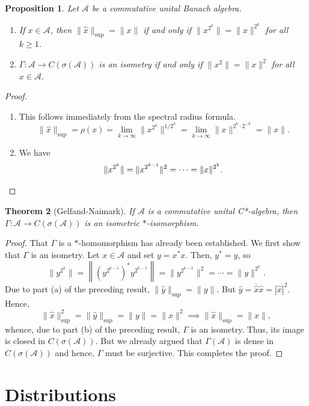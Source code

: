 \documentclass[11pt]{article}
\theoremstyle{thmstyle}
\newtheorem{theorem}{Theorem}[section]
\newtheorem{proposition}[theorem]{Proposition}
\theoremstyle{defstyle}
\newcommand{\calA}{\mathcal{A}} %
\newcommand{\wh}[1]{\widehat{#1}}
\renewcommand{\ge}{\geqslant}
\begin{document}
\begin{proposition}
    Let $\calA$ be a commutative unital Banach algebra. 
    \begin{enumerate}[label=(\alph*)]
    \item If $x\in\calA$, then $\|\wh x\|_{\sup} = \|x\|$ if and only if $\|x^{2^k}\| = \|x\|^{2^k}$ for all $k\ge 1$. 
    \item $\Gamma:\calA\to C(\sigma(\calA))$ is an isometry if and only if $\|x^2\| = \|x\|^2$ for all $x\in\calA$.
    \end{enumerate}
\end{proposition}
\begin{proof}
\begin{enumerate}[label=(\alph*)]
    \item This follows immediately from the spectral radius formula. 
    \begin{equation*}
        \|\wh x\|_{\sup} = \rho(x) = \lim_{k\to\infty}\|x^{2^k}\|^{1/2^k} = \lim_{k\to\infty}\|x\|^{2^k\cdot 2^{-k}} = \|x\|.
    \end{equation*}
    \item We have
    \begin{equation*}
        \|x^{2^k}\| = \|x^{2^{k - 1}}\|^2 = \cdots = \|x\|^{2^k}. \qedhere
    \end{equation*}
\end{enumerate}
\end{proof}

\begin{theorem}[Gelfand-Naimark]
    If $\calA$ is a commutative unital C*-algebra, then $\Gamma:\calA\to C(\sigma(\calA))$ is an isometric $\ast$-isomorphism.
\end{theorem}
\begin{proof}
    That $\Gamma$ is a $\ast$-homomorphism has already been established. We first show that $\Gamma$ is an isometry. Let $x\in\calA$ and set $y = x^\ast x$. Then, $y^\ast = y$, so 
    \begin{equation*}
        \|y^{2^k}\| = \left\|\left(y^{2^{k - 1}}\right)^\ast y^{2^{k - 1}}\right\| = \|y^{2^{k - 1}}\|^2 = \cdots = \|y\|^{2^k}.
    \end{equation*}
    Due to part (a) of the preceding result, $\|\wh y\|_{\sup} = \|y\|$. But $\wh y = \overline{\wh x}\wh x = |\wh x|^2$. Hence,
    \begin{equation*}
        \|\wh x\|_{\sup}^2 = \|\wh y\|_{\sup} = \|y\| = \|x\|^2\implies\|\wh x\|_{\sup} = \|x\|,
    \end{equation*}
    whence, due to part (b) of the preceding result, $\Gamma$ is an isometry. Thus, its image is closed in $C(\sigma(\calA))$. But we already argued that $\Gamma(\calA)$ is dense in $C(\sigma(\calA))$ and hence, $\Gamma$ must be surjective. This completes the proof.
\end{proof}

\section{Distributions}

\end{document}
